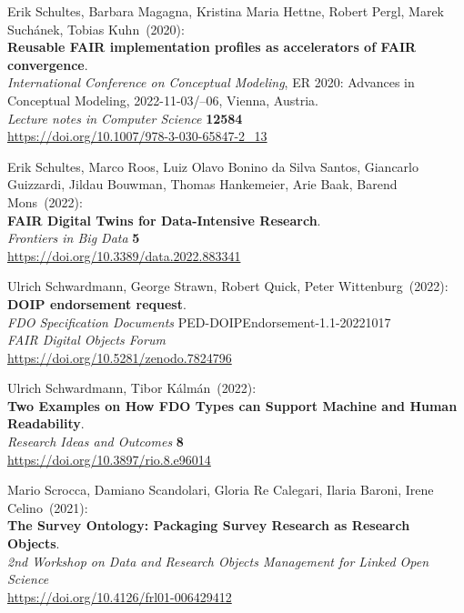 \begin{thebibliography}{9}
Erik Schultes, Barbara Magagna, Kristina Maria Hettne, Robert Pergl,
Marek Suchánek, Tobias Kuhn~(2020): \\
\textbf{Reusable {FAIR} implementation profiles as accelerators of {FAIR} convergence}.\\
\emph{International Conference on Conceptual Modeling}, ER 2020: Advances in Conceptual Modeling, 2022-11-03/--06, Vienna, Austria. \\
\emph{Lecture notes in Computer Science} \textbf{12584} \\ 
\url{https://doi.org/10.1007/978-3-030-65847-2_13}

Erik Schultes, Marco Roos, Luiz Olavo Bonino da Silva Santos, Giancarlo Guizzardi, Jildau Bouwman, Thomas Hankemeier, Arie Baak, Barend Mons~(2022): \\
\textbf{FAIR Digital Twins for Data-Intensive Research}.\\
\emph{Frontiers in Big Data} \textbf{5}\\
\url{https://doi.org/10.3389/data.2022.883341}

Ulrich Schwardmann, George Strawn, Robert Quick, Peter Wittenburg~(2022): \\
\textbf{DOIP endorsement request}.\\
\emph{FDO Specification Documents} PED-DOIPEndorsement-1.1-20221017\\
\emph{FAIR Digital Objects Forum}\\
\url{https://doi.org/10.5281/zenodo.7824796}

Ulrich Schwardmann, Tibor Kálmán~(2022): \\
\textbf{Two {Examples} on {How FDO Types} can {Support Machine} and {Human Readability}}.\\
\emph{Research Ideas and Outcomes} \textbf{8} \\
\url{https://doi.org/10.3897/rio.8.e96014}

Mario Scrocca, Damiano Scandolari, Gloria Re Calegari, Ilaria Baroni, Irene Celino~(2021): \\
\textbf{The Survey Ontology: Packaging Survey Research as Research Objects}.\\
\emph{2nd Workshop on Data and Research Objects Management for Linked Open Science}\\
\url{https://doi.org/10.4126/frl01-006429412}


\end{thebibliography}
